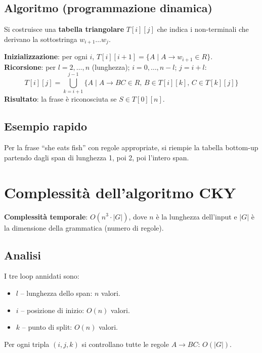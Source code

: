 \documentclass[12pt,a4paper]{article}
\begin{document}
\subsection{Algoritmo (programmazione dinamica)}
Si costruisce una \textbf{tabella triangolare} $T[i][j]$ che indica i non-terminali che derivano la sottostringa $w_{i+1} \dots w_j$.

\begin{defbox}
\textbf{Inizializzazione}: per ogni $i$, $T[i][i+1] = \{A \mid A \to w_{i+1} \in R\}$.\\[4pt]
\textbf{Ricorsione}: per $l = 2, \dots, n$ (lunghezza); $i = 0, \dots, n-l$; $j = i+l$:
\[
T[i][j] = \bigcup_{k=i+1}^{j-1} \{A \mid A \to BC \in R,\, B \in T[i][k],\, C \in T[k][j]\}
\]
\textbf{Risultato}: la frase è riconosciuta se $S \in T[0][n]$.
\end{defbox}

\subsection{Esempio rapido}
Per la frase ``she eats fish'' con regole appropriate, si riempie la tabella bottom-up partendo dagli span di lunghezza 1, poi 2, poi l'intero span.

\section{Complessità dell'algoritmo CKY}

\begin{defbox}
\textbf{Complessità temporale}: $O(n^3 \cdot |G|)$, dove $n$ è la lunghezza dell'input e $|G|$ è la dimensione della grammatica (numero di regole).
\end{defbox}

\subsection{Analisi}
I tre loop annidati sono:
\begin{itemize}[leftmargin=1.5em]
  \item $l$ -- lunghezza dello span: $n$ valori.
  \item $i$ -- posizione di inizio: $O(n)$ valori.
  \item $k$ -- punto di split: $O(n)$ valori.
\end{itemize}
Per ogni tripla $(i,j,k)$ si controllano tutte le regole $A \to BC$: $O(|G|)$.
\end{document}
